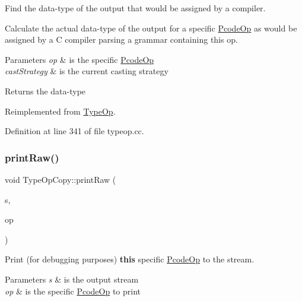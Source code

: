 Find the data-\/type of the output that would be assigned by a compiler. 

Calculate the actual data-\/type of the output for a specific \mbox{\hyperlink{class_pcode_op}{Pcode\+Op}} as would be assigned by a C compiler parsing a grammar containing this op. 
\begin{DoxyParams}{Parameters}
{\em op} & is the specific \mbox{\hyperlink{class_pcode_op}{Pcode\+Op}} \\
\hline
{\em cast\+Strategy} & is the current casting strategy \\
\hline
\end{DoxyParams}
\begin{DoxyReturn}{Returns}
the data-\/type 
\end{DoxyReturn}


Reimplemented from \mbox{\hyperlink{class_type_op_a7150ac93bb03a993735c829deb5237e7}{Type\+Op}}.



Definition at line 341 of file typeop.\+cc.

\mbox{\label{class_type_op_copy_a637e83726874a26ba653e6db34d0bb1b}} 
\subsubsection{\texorpdfstring{printRaw()}{printRaw()}}
{\footnotesize\ttfamily void Type\+Op\+Copy\+::print\+Raw (\begin{DoxyParamCaption}\item[{ostream \&}]{s,  }\item[{const \mbox{\hyperlink{class_pcode_op}{Pcode\+Op}} $\ast$}]{op }\end{DoxyParamCaption})\hspace{0.3cm}{\ttfamily [virtual]}}



Print (for debugging purposes) {\bfseries{this}} specific \mbox{\hyperlink{class_pcode_op}{Pcode\+Op}} to the stream. 


\begin{DoxyParams}{Parameters}
{\em s} & is the output stream \\
\hline
{\em op} & is the specific \mbox{\hyperlink{class_pcode_op}{Pcode\+Op}} to print \\
\hline
\end{DoxyParams}


